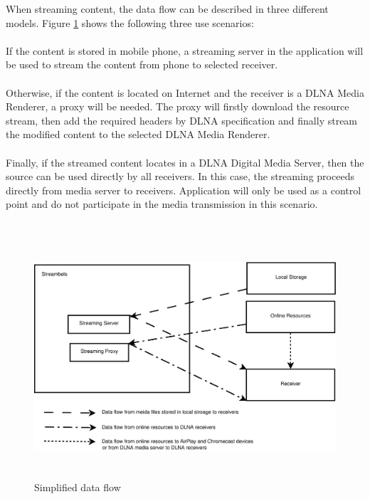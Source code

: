 When streaming content, the data flow can be described in three different models. Figure \ref{chart4} shows the following three use scenarios:\\
\\ 
If the content is stored in mobile phone, a streaming server in the application will be used to stream the content from phone to selected receiver.\\
\\
Otherwise, if the content is located on Internet and the receiver is a DLNA Media Renderer, a proxy will be needed. The proxy will firstly download the resource stream, then add the required headers by DLNA specification and finally stream the modified content to the selected DLNA Media Renderer.\\
\\
Finally, if the streamed content locates in a DLNA Digital Media Server, then the source can be used directly by all receivers. In this case, the streaming proceeds directly from media server to receivers. Application will only be used as a control point and do not participate in the media transmission in this scenario.\\
\\
\begin{figure}[htb]
\centering \includegraphics[height=9cm]{charts/data_flow}
\caption{Simplified data flow \label{chart4}}
\end{figure}


